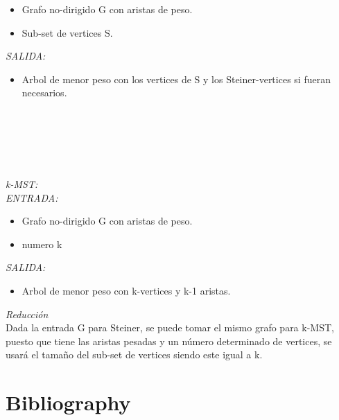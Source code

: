 \documentclass[preprint,12pt]{elsarticle}
\begin{document}
\begin{itemize}
\item Grafo no-dirigido G con aristas de peso.
\item Sub-set de vertices S.
\end{itemize}


\textit{SALIDA: }

\begin{itemize}
\item Arbol de menor peso con los vertices de S y los Steiner-vertices si fueran necesarios.\\\\\\\\\\\\

\end{itemize}



\textit{ k-MST:}\\

\textit{ENTRADA: }

\begin{itemize}
\item Grafo no-dirigido G con aristas de peso.
\item numero k
\end{itemize}


\textit{SALIDA: }

\begin{itemize}
\item Arbol de menor peso con k-vertices y k-1 aristas.

\end{itemize}

\textit{Reducción }\\
\textnormal{Dada la entrada G para Steiner, se puede tomar el mismo grafo para k-MST, puesto que tiene las aristas pesadas y un número determinado de vertices, se usará el tamaño del sub-set de vertices siendo este igual a k.}







\appendix
\section*{Bibliography}

\end{document}

